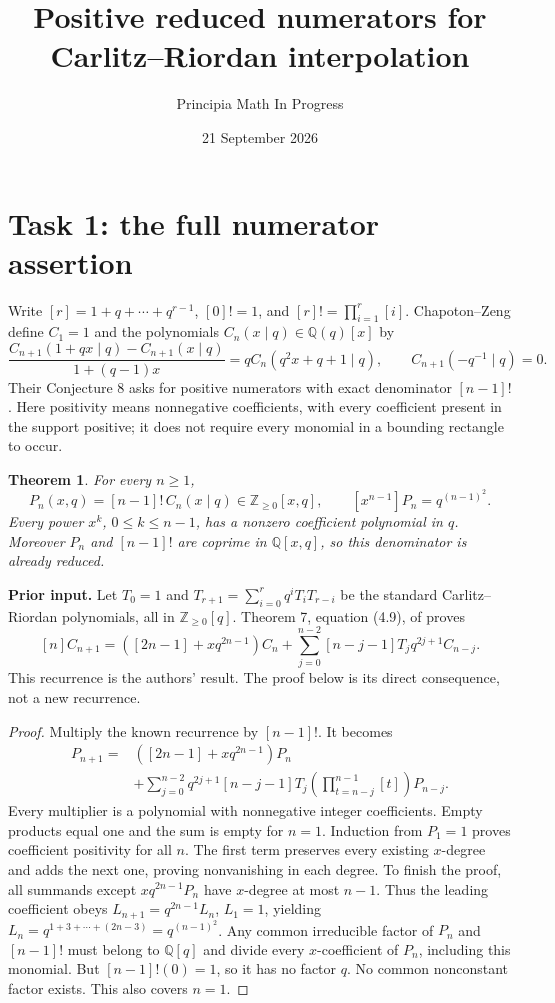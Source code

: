\documentclass[11pt]{article}
\title{Positive reduced numerators for Carlitz--Riordan interpolation}
\author{Principia Math In Progress}
\date{21 September 2026}
\newtheorem{theorem}{Theorem}
\begin{document}
\maketitle
\section*{Task 1: the full numerator assertion}
Write $[r]=1+q+\cdots+q^{r-1}$, $[0]!=1$, and
$[r]!=\prod_{i=1}^r[i]$. Chapoton--Zeng \cite{CZ} define $C_1=1$
and the polynomials $C_n(x\mid q)\in\mathbb Q(q)[x]$ by
\[
 \frac{C_{n+1}(1+qx\mid q)-C_{n+1}(x\mid q)}{1+(q-1)x}
       =qC_n(q^2x+q+1\mid q),\qquad
 C_{n+1}(-q^{-1}\mid q)=0.
\]
Their Conjecture 8 asks for positive numerators with exact denominator
$[n-1]!$. Here positivity means nonnegative coefficients, with every
coefficient present in the support positive; it does not require every
monomial in a bounding rectangle to occur.

\begin{theorem}
For every $n\geq1$,
\[
 P_n(x,q)=[n-1]!\,C_n(x\mid q)\in\mathbb Z_{\geq0}[x,q],
 \qquad [x^{n-1}]P_n=q^{(n-1)^2}.
\]
Every power $x^k$, $0\leq k\leq n-1$, has a nonzero coefficient
polynomial in $q$. Moreover $P_n$ and $[n-1]!$ are coprime in
$\mathbb Q[x,q]$, so this denominator is already reduced.
\end{theorem}

\noindent\textbf{Prior input.}
Let $T_0=1$ and
$T_{r+1}=\sum_{i=0}^r q^iT_iT_{r-i}$ be the standard
Carlitz--Riordan polynomials, all in $\mathbb Z_{\geq0}[q]$.
Theorem 7, equation (4.9), of \cite{CZ} proves
\[
 [n]C_{n+1}=([2n-1]+xq^{2n-1})C_n+
 \sum_{j=0}^{n-2}[n-j-1]T_jq^{2j+1}C_{n-j}.
\]
This recurrence is the authors' result. The proof below is its direct
consequence, not a new recurrence.

\begin{proof}
Multiply the known recurrence by $[n-1]!$. It becomes
\begin{align*}
 P_{n+1}={}&([2n-1]+xq^{2n-1})P_n\\
 &+\sum_{j=0}^{n-2}
 q^{2j+1}[n-j-1]T_j
 \left(\prod_{t=n-j}^{n-1}[t]\right)P_{n-j}.
\end{align*}
Every multiplier is a polynomial with nonnegative integer coefficients.
Empty products equal one and the sum is empty for $n=1$.
Induction from $P_1=1$ proves coefficient positivity for all $n$.
The first term preserves every existing $x$-degree and adds the next one,
proving nonvanishing in each degree.
\newpage
\noindent
To finish the proof, all summands except $xq^{2n-1}P_n$ have
$x$-degree at most $n-1$. Thus the leading coefficient obeys
$L_{n+1}=q^{2n-1}L_n$, $L_1=1$, yielding
$L_n=q^{1+3+\cdots+(2n-3)}=q^{(n-1)^2}$.
Any common irreducible factor of $P_n$ and $[n-1]!$ must belong
to $\mathbb Q[q]$ and divide every $x$-coefficient of $P_n$,
including this monomial. But $[n-1]!(0)=1$, so it has no factor $q$.
No common nonconstant factor exists. This also covers $n=1$.
\end{proof}
\end{document}
